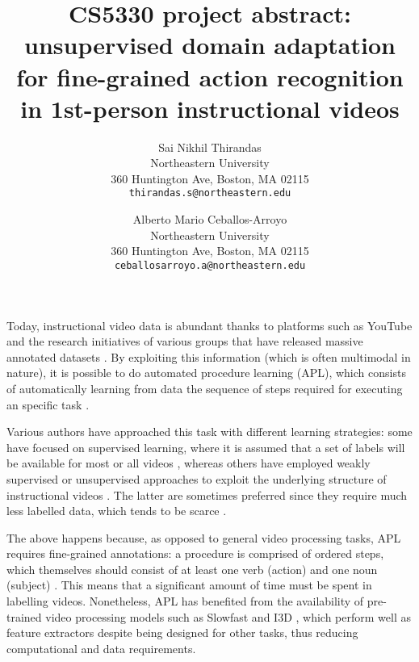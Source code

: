 \documentclass[final]{cvpr}
\begin{document}
\title{CS5330 project abstract: unsupervised domain adaptation for fine-grained action recognition in 1st-person instructional videos}

\author{Sai Nikhil Thirandas\\
Northeastern University\\
360 Huntington Ave, Boston, MA 02115\\
{\tt\small thirandas.s@northeastern.edu}
\and
Alberto Mario Ceballos-Arroyo\\
Northeastern University\\
360 Huntington Ave, Boston, MA 02115\\
{\tt\small ceballosarroyo.a@northeastern.edu}
}

\maketitle






Today, instructional video data is abundant thanks to platforms such as YouTube and the research initiatives of various groups that have released massive annotated datasets \cite{Zhou2018-qz, Munro2020-ui}. By exploiting this information (which is often multimodal in nature), it is possible to do automated procedure learning (APL), which consists of automatically learning from data the sequence of steps required for executing an specific task \cite{Elhamifar2019-pi}.

Various authors have approached this task with different learning strategies: some have focused on supervised learning, where it is assumed that a set of labels will be available for most or all videos \cite{Bakr2020-cf, Zhao2020-yl}, whereas others have employed weakly supervised or unsupervised approaches to exploit the underlying structure of instructional videos \cite{Wang2021-wk}. The latter are sometimes preferred since they require much less labelled data, which tends to be scarce \cite{Elhamifar2020-xz}.

The above happens because, as opposed to general video processing tasks, APL requires fine-grained annotations: a procedure is comprised of ordered steps, which themselves should consist of at least one verb (action) and one noun (subject) \cite{Hussein2019-to}. This means that a significant amount of time must be spent in labelling videos. Nonetheless, APL has benefited from the availability of pre-trained video processing models such as Slowfast \cite{Feichtenhofer2018-nc} and I3D \cite{Carreira2017-qz}, which perform well as feature extractors despite being designed for other tasks, thus reducing computational and data requirements.
\end{document}
